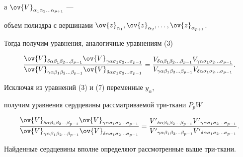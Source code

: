 а $\ov{V}_{\alpha_{1} \alpha_{2}\dotsc\alpha_{p+1}}$ ---


объем полиэдра с вершинами $\ov{z}_{\alpha_{1}}, \ov{z}_{\alpha_{2}}, \dotsc,


\ov{z}_{\alpha_{p+1}}$.


Тогда получим уравнения, аналогичные уравнениям (3)


\begin{equation}


\frac{\ov{V}_{\delta \alpha \beta_{1} \beta_{2}\dotsc\beta_{p-1}}


\ov{V}_{\gamma \alpha \sigma_{1} \sigma_{2}\dotsc\sigma_{p-1}}}


{\ov{V}_{\gamma \alpha \beta_{1} \beta_{2}\dotsc\beta_{p-1}}


\ov{V}_{\delta \alpha \sigma_{1} \sigma_{2}\dotsc\sigma_{p-1}}}=


\frac{{V}_{\delta \alpha \beta_{1} \beta_{2}\dotsc\beta_{p-1}}


{V}_{\gamma \alpha \sigma_{1} \sigma_{2}\dotsc\sigma_{p-1}}}


{{V}_{\gamma \alpha \beta_{1} \beta_{2}\dotsc\beta_{p-1}}


{V}_{\delta \alpha \sigma_{1} \sigma_{2}\dotsc\sigma_{p-1}}}.


\end{equation}


Исключая из уравнений (3) и (7) переменные $y_{\alpha}$,


получим уравнения сердцевины рассматриваемой три-ткани $P_{p}W$


$$


\frac{\ov{V}_{\delta \alpha \beta_{1} \beta_{2}\dotsc\beta_{p-1}}


\ov{V}_{\gamma \alpha \sigma_{1} \sigma_{2}\dotsc\sigma_{p-1}}}


{\ov{V}_{\gamma \alpha \beta_{1} \beta_{2}\dotsc\beta_{p-1}}


\ov{V}_{\delta \alpha \sigma_{1} \sigma_{2}\dotsc\sigma_{p-1}}}=


\frac{{V'}_{\delta \alpha \beta_{1} \beta_{2}\dotsc\beta_{p-1}}


{V'}_{\gamma \alpha \sigma_{1} \sigma_{2}\dotsc\sigma_{p-1}}}


{{V'}_{\gamma \alpha \beta_{1} \beta_{2}\dotsc\beta_{p-1}}


{V'}_{\delta \alpha \sigma_{1} \sigma_{2}\dotsc\sigma_{p-1}}}.


$$


Найденные сердцевины вполне определяют рассмотренные выше три-ткани.





